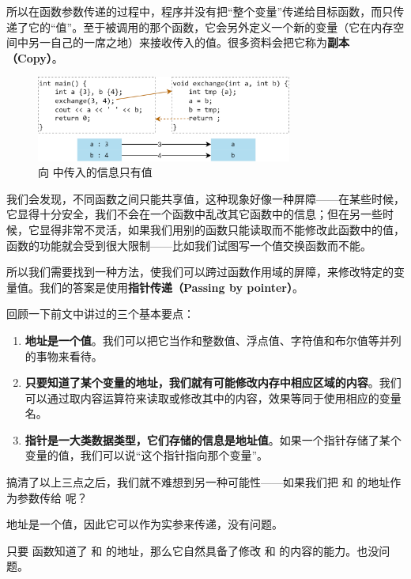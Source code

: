 所以在函数参数传递的过程中，程序并没有把``整个变量''传递给目标函数，而只传递了它的``值''。至于被调用的那个函数，它会另外定义一个新的变量（它在内存空间中另一自己的一席之地）来接收传入的值。很多资料会把它称为\textbf{副本（Copy）}。\par
\begin{figure}[htbp]
    \centering
    \includegraphics[width=0.75\textwidth]{../images/generalized_parts/05_process_of_pass_by_value.drawio.png}
    \caption{\lstinline@main@ 向 \lstinline@exchange@ 中传入的信息只有值}
\end{figure}
我们会发现，不同函数之间只能共享值，这种现象好像一种屏障——在某些时候，它显得十分安全，我们不会在一个函数中乱改其它函数中的信息；但在另一些时候，它显得非常不灵活，如果我们用别的函数只能读取而不能修改此函数中的值，函数的功能就会受到很大限制——比如我们试图写一个值交换函数而不能。\par
所以我们需要找到一种方法，使我们可以跨过函数作用域的屏障，来修改特定的变量值。我们的答案是使用\textbf{指针传递（Passing by pointer）}。\par
回顾一下前文中讲过的三个基本要点：
\begin{enumerate}
    \item \textbf{地址是一个值}。我们可以把它当作和整数值、浮点值、字符值和布尔值等并列的事物来看待。
    \item \textbf{只要知道了某个变量的地址，我们就有可能修改内存中相应区域的内容}。我们可以通过取内容运算符来读取或修改其中的内容，效果等同于使用相应的变量名。
    \item \textbf{指针是一大类数据类型，它们存储的信息是地址值}。如果一个指针存储了某个变量的值，我们可以说``这个指针指向那个变量''。
\end{enumerate}\par
搞清了以上三点之后，我们就不难想到另一种可能性——如果我们把 \lstinline@a@ 和 \lstinline@b@ 的地址作为参数传给 \lstinline@exchange@ 呢？\par
地址是一个值，因此它可以作为实参来传递，没有问题。\par
只要 \lstinline@exchange@ 函数知道了 \lstinline@a@ 和 \lstinline@b@ 的地址，那么它自然具备了修改 \lstinline@a@ 和 \lstinline@b@ 的内容的能力。也没问题。\par
